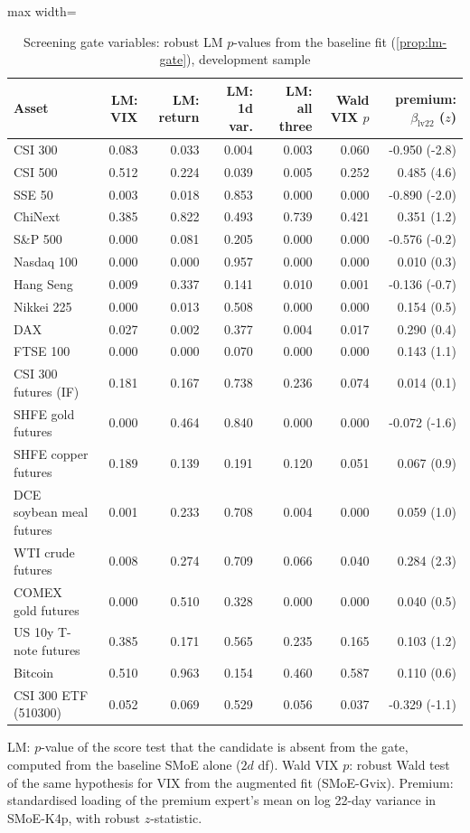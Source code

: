 \begin{table}[!htbp]\centering\footnotesize
\caption{Screening gate variables: robust LM $p$-values from the baseline fit (\cref{prop:lm-gate}), development sample}\label{tab:kg-lm}
\begin{adjustbox}{max width=\textwidth}
\begin{tabular}{lrrrrrr}
\toprule
Asset & LM: VIX & LM: return & LM: 1d var. & LM: all three & Wald VIX $p$ & premium: $\beta_{\mathrm{lv22}}$ ($z$)\\
\midrule
CSI 300 & 0.083 & 0.033 & 0.004 & 0.003 & 0.060 & -0.950 (-2.8)\\
CSI 500 & 0.512 & 0.224 & 0.039 & 0.005 & 0.252 & 0.485 (4.6)\\
SSE 50 & 0.003 & 0.018 & 0.853 & 0.000 & 0.000 & -0.890 (-2.0)\\
ChiNext & 0.385 & 0.822 & 0.493 & 0.739 & 0.421 & 0.351 (1.2)\\
S\&P 500 & 0.000 & 0.081 & 0.205 & 0.000 & 0.000 & -0.576 (-0.2)\\
Nasdaq 100 & 0.000 & 0.000 & 0.957 & 0.000 & 0.000 & 0.010 (0.3)\\
Hang Seng & 0.009 & 0.337 & 0.141 & 0.010 & 0.001 & -0.136 (-0.7)\\
Nikkei 225 & 0.000 & 0.013 & 0.508 & 0.000 & 0.000 & 0.154 (0.5)\\
DAX & 0.027 & 0.002 & 0.377 & 0.004 & 0.017 & 0.290 (0.4)\\
FTSE 100 & 0.000 & 0.000 & 0.070 & 0.000 & 0.000 & 0.143 (1.1)\\
CSI 300 futures (IF) & 0.181 & 0.167 & 0.738 & 0.236 & 0.074 & 0.014 (0.1)\\
SHFE gold futures & 0.000 & 0.464 & 0.840 & 0.000 & 0.000 & -0.072 (-1.6)\\
SHFE copper futures & 0.189 & 0.139 & 0.191 & 0.120 & 0.051 & 0.067 (0.9)\\
DCE soybean meal futures & 0.001 & 0.233 & 0.708 & 0.004 & 0.000 & 0.059 (1.0)\\
WTI crude futures & 0.008 & 0.274 & 0.709 & 0.066 & 0.040 & 0.284 (2.3)\\
COMEX gold futures & 0.000 & 0.510 & 0.328 & 0.000 & 0.000 & 0.040 (0.5)\\
US 10y T-note futures & 0.385 & 0.171 & 0.565 & 0.235 & 0.165 & 0.103 (1.2)\\
Bitcoin & 0.510 & 0.963 & 0.154 & 0.460 & 0.587 & 0.110 (0.6)\\
CSI 300 ETF (510300) & 0.052 & 0.069 & 0.529 & 0.056 & 0.037 & -0.329 (-1.1)\\
\bottomrule
\end{tabular}
\end{adjustbox}
\par\smallskip\begin{minipage}{\textwidth}\footnotesize
LM: $p$-value of the score test that the candidate is absent from the gate, computed from the baseline SMoE alone ($2d$ df). Wald VIX $p$: robust Wald test of the same hypothesis for VIX from the augmented fit (SMoE-Gvix). Premium: standardised loading of the premium expert's mean on log 22-day variance in SMoE-K4p, with robust $z$-statistic.
\end{minipage}
\end{table}
